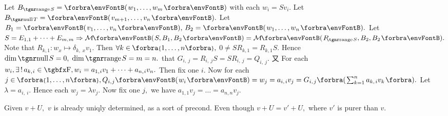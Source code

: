 Let $B_{\range S}=\Par{w_1,\dots,w_m}$ with each $w_i=Sv_i.$\parSol{}
Let $B_{\null T}=\Par{v_{m+1},\dots,v_n}.$ Let $B_1=\Par{v_1,\dots,v_n},\,B_2=\Par{w_1,\dots,w_n}.$\parSol{}
{\vspace{2pt}Let {$S=E_{1,1}+\dots+E_{m,\:\!m}\Rightarrow \Mt{S,B_1,B_2}=\Mt{P_{\!\!\;\!\range S},B_2,B_2}.$} Note that $R_{k,1}:w_x\mapsto\delta_{k,\;\!x}v_1.$}\parSol{}
{\vspace{2pt}Then $\forall k\in\;\!\!\Bra{1,\dots,n},$ {\FontLarge$0\neq SR_{k,1}=R_{k,1}S.$} Hence $\dim\null S=0,\;\dim\range S=m=n.$}\parSol{}
\vspace{2pt}\NOTICE that {\FontLarge$G_{i,\:\!j}=R_{i,\:\!j}S=SR_{i,\:\!j}=Q_{i,\:\!j}$}. 又 For each $w_i,\exists\,!\,a_{k,\:\!i}\in\Fbb,w_i=a_{1,\:\!i}v_1+\dots+a_{n,\:\!i}v_n.$\parSol{}
Then fix one $i.$ Now for each $j\in\;\!\!\Bra{1,\dots,n},Q_{i,\:\!j}\Par{w_i}=w_j=a_{i,\;\!i}v_j=G_{i,\;\!j}\BigBigPar{{\sum_{k=1}^na_{k,\;\!i} v_k}}.$\parSol{}
Let $\lambda=a_{i,\:\!i}.$ Hence each $w_j=\lambda v_j.$ Now fix one $j,$ we have $a_{1,1}v_j=\dots=a_{n,n}v_j.$\PfEnd
\SepLine

%
\ChEnd
\pagebreak


\vspace{4pt}

\BulletPointX{}\;\;Given $v+U,$ $v$ is already uniqly determined, as a sort of precond.\TextB{}
Even though $v+U=v'+U,$ where $v'$ is {\tgsl purer} than $v.$
\SepLine

\BulletPointX\NoteForSmall{[3.85]}\;\;
\SepLine

